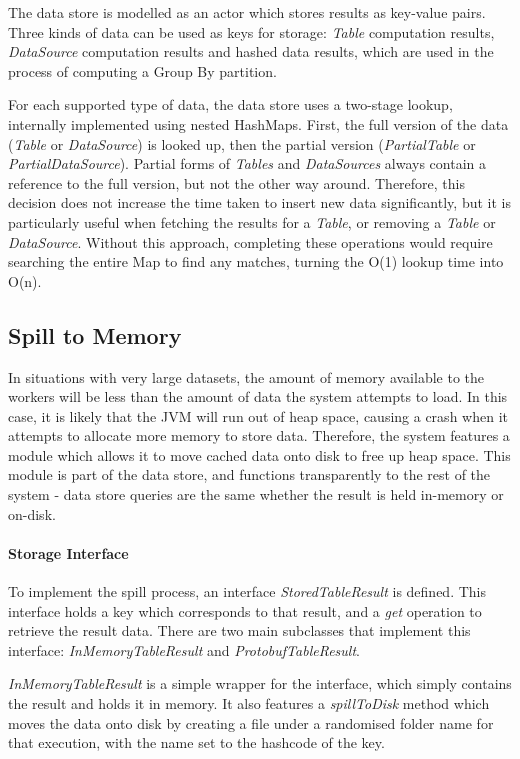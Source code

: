 The data store is modelled as an actor which stores results as key-value pairs. Three kinds of data can be used as keys for storage: \textit{Table} computation results, \textit{DataSource} computation results and hashed data results, which are used in the process of computing a Group By partition. 

For each supported type of data, the data store uses a two-stage lookup, internally implemented using nested HashMaps. First, the full version of the data (\textit{Table} or \textit{DataSource}) is looked up, then the partial version (\textit{PartialTable} or \textit{PartialDataSource}). Partial forms of \textit{Tables} and \textit{DataSources} always contain a reference to the full version, but not the other way around. Therefore, this decision does not increase the time taken to insert new data significantly, but it is particularly useful when fetching the results for a \textit{Table}, or removing a \textit{Table} or \textit{DataSource}. Without this approach, completing these operations would require searching the entire Map to find any matches, turning the O(1) lookup time into O(n).

\subsection{Spill to Memory}
In situations with very large datasets, the amount of memory available to the workers will be less than the amount of data the system attempts to load. In this case, it is likely that the JVM will run out of heap space, causing a crash when it attempts to allocate more memory to store data. Therefore, the system features a module which allows it to move cached data onto disk to free up heap space. This module is part of the data store, and functions transparently to the rest of the system - data store queries are the same whether the result is held in-memory or on-disk.

\paragraph{Storage Interface}
To implement the spill process, an interface \textit{StoredTableResult} is defined. This interface holds a key which corresponds to that result, and a \textit{get} operation to retrieve the result data. There are two main subclasses that implement this interface: \textit{InMemoryTableResult} and \textit{ProtobufTableResult}. 

\textit{InMemoryTableResult} is a simple wrapper for the interface, which simply contains the result and holds it in memory. It also features a \textit{spillToDisk} method which moves the data onto disk by creating a file under a randomised folder name for that execution, with the name set to the hashcode of the key. 

